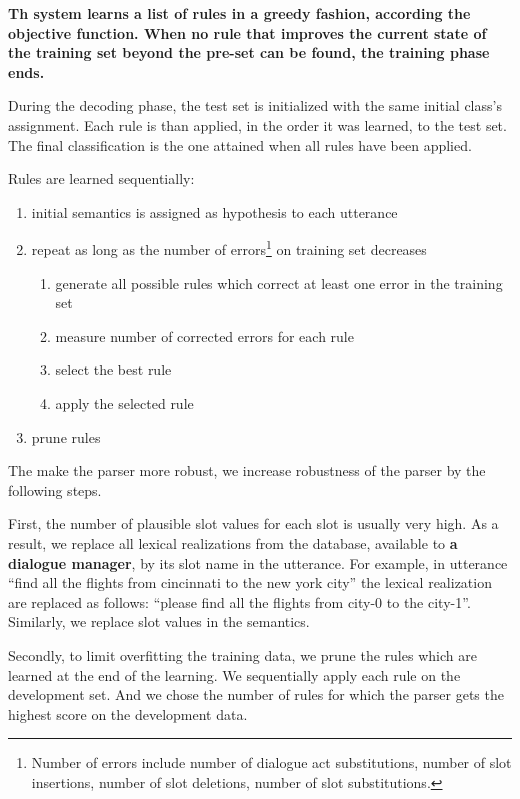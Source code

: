 \documentclass[11pt]{article}
\begin{document}
\textbf{Th system learns a list of rules in a greedy fashion, according the objective function. When no rule that improves the current state of the training set beyond the pre-set can be found, the training phase ends.}

During the decoding phase, the test set is initialized with the same initial class's assignment. Each rule is than applied, in the order it was learned, to the test set. The final classification is the one attained when all rules have been applied.


Rules are learned sequentially:
\begin{enumerate}
  \item initial semantics is assigned as hypothesis to each utterance
  \item repeat as long as the number of errors\footnote{Number of errors include number of dialogue act substitutions, number of slot insertions, number of slot deletions, number of slot substitutions.} on training set decreases
  \begin{enumerate}
    \item generate all possible rules which correct at least one error in the training set
    \item measure number of corrected errors for each rule
    \item select the best rule
    \item apply the selected rule
  \end{enumerate}
  \item prune rules
\end{enumerate}

The make the parser more robust, we increase robustness of the parser by the following steps. 

First, the number of plausible slot values for each slot is usually very high. As a result, we replace all lexical realizations from the database, available to \textbf{a dialogue manager}, by its slot name in the utterance. For example, in utterance ``find all the flights from cincinnati to the new york city'' the lexical realization are replaced as follows: ``please find all the flights from city-0 to the city-1''. Similarly, we replace slot values in the semantics.

Secondly, to limit overfitting the training data, we prune the rules which are learned at the end of the learning. We sequentially apply each rule on the development set. And we chose the number of rules for which the parser gets the highest score on the development data.
\end{document}
